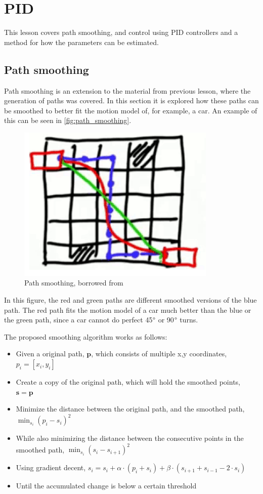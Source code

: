 \documentclass[Main]{subfiles}
\begin{document}
\section{PID} %
	\label{sec:pid}
This lesson covers path smoothing, and control using PID controllers and a method for how the parameters can be estimated.

\subsection{Path smoothing}
Path smoothing is an extension to the material from previous lesson, where the generation of paths was covered. 
In this section it is explored how these paths can be smoothed to better fit the motion model of, for example, a car. 
An example of this can be seen in \autoref{fig:path_smoothing}.
\begin{figure}[H]
	\centering
	\includegraphics[scale=1]{./Figures/path_smoothing.png}
	\caption{Path smoothing, borrowed from \citep{Thrun2015}}
	\label{fig:path_smoothing}
\end{figure}\noindent
In this figure, the red and green paths are different smoothed versions of the blue path. 
The red path fits the motion model of a car much better than the blue or the green path, since a car cannot do perfect 45$\degree$ or 90$\degree$ turns.

The proposed smoothing algorithm works as follows:
\begin{itemize}
	\item Given a original path, $\mathbf{p}$, which consists of multiple x,y coordinates, $ p_i = [x_i,y_i]$
	\item Create a copy of the original path, which will hold the smoothed points, $\mathbf{s} = \mathbf{p}$
	\item Minimize the distance between the original path, and the smoothed path, $\min_{s_i}(p_i-s_i)^2$
	\item While also minimizing the distance between the consecutive points in the smoothed path, $		\min_{s_i}(s_i-s_{i+1})^2$
	\item Using gradient decent, $s_i = s_i + \alpha \cdot (p_i + s_i) + \beta \cdot (s_{i+1} + s_{i-1} - 2 \cdot s_i)$
	\item Until the accumulated change is below a certain threshold
\end{itemize}
\end{document}
